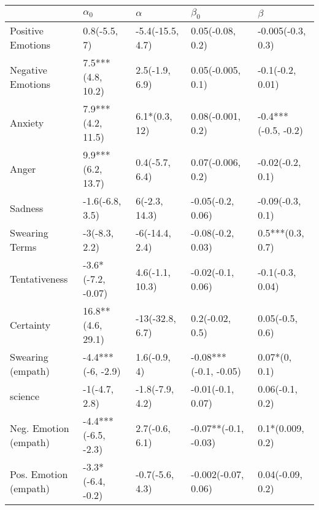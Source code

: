 \begin{tabular}{lllll}
\toprule
{} &           $\alpha_0$ &          $\alpha$ &              $\beta_0$ &              $\beta$ \\
\midrule
Positive Emotions     &         0.8(-5.5, 7) &  -5.4(-15.5, 4.7) &       0.05(-0.08, 0.2) &    -0.005(-0.3, 0.3) \\
Negative Emotions     &    7.5***(4.8, 10.2) &    2.5(-1.9, 6.9) &      0.05(-0.005, 0.1) &     -0.1(-0.2, 0.01) \\
Anxiety               &    7.9***(4.2, 11.5) &     6.1*(0.3, 12) &      0.08(-0.001, 0.2) &  -0.4***(-0.5, -0.2) \\
Anger                 &    9.9***(6.2, 13.7) &    0.4(-5.7, 6.4) &      0.07(-0.006, 0.2) &     -0.02(-0.2, 0.1) \\
Sadness               &      -1.6(-6.8, 3.5) &     6(-2.3, 14.3) &      -0.05(-0.2, 0.06) &     -0.09(-0.3, 0.1) \\
Swearing Terms        &        -3(-8.3, 2.2) &    -6(-14.4, 2.4) &      -0.08(-0.2, 0.03) &     0.5***(0.3, 0.7) \\
Tentativeness         &   -3.6*(-7.2, -0.07) &   4.6(-1.1, 10.3) &      -0.02(-0.1, 0.06) &     -0.1(-0.3, 0.04) \\
Certainty             &    16.8**(4.6, 29.1) &   -13(-32.8, 6.7) &        0.2(-0.02, 0.5) &      0.05(-0.5, 0.6) \\
Swearing (empath)     &    -4.4***(-6, -2.9) &      1.6(-0.9, 4) &  -0.08***(-0.1, -0.05) &        0.07*(0, 0.1) \\
science               &        -1(-4.7, 2.8) &   -1.8(-7.9, 4.2) &      -0.01(-0.1, 0.07) &      0.06(-0.1, 0.2) \\
Neg. Emotion (empath) &  -4.4***(-6.5, -2.3) &    2.7(-0.6, 6.1) &   -0.07**(-0.1, -0.03) &     0.1*(0.009, 0.2) \\
Pos. Emotion (empath) &    -3.3*(-6.4, -0.2) &   -0.7(-5.6, 4.3) &    -0.002(-0.07, 0.06) &     0.04(-0.09, 0.2) \\
\bottomrule
\end{tabular}

